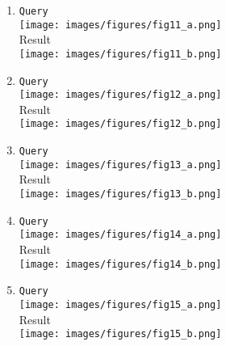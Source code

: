 \documentclass[12pt,titlepage]{article}
\begin{document}
\begin{enumerate}
    \item \texttt{Query} \\ \texttt{[image: images/figures/fig11\_a.png]} \\ Result \\ \texttt{[image: images/figures/fig11\_b.png]}
    \item \texttt{Query} \\ \texttt{[image: images/figures/fig12\_a.png]} \\ Result \\ \texttt{[image: images/figures/fig12\_b.png]}
    \item \texttt{Query} \\ \texttt{[image: images/figures/fig13\_a.png]} \\ Result \\ \texttt{[image: images/figures/fig13\_b.png]}
    \item \texttt{Query} \\ \texttt{[image: images/figures/fig14\_a.png]} \\ Result \\ \texttt{[image: images/figures/fig14\_b.png]}
    \item \texttt{Query} \\ \texttt{[image: images/figures/fig15\_a.png]} \\ Result \\ \texttt{[image: images/figures/fig15\_b.png]}
\end{enumerate}
\end{document}

